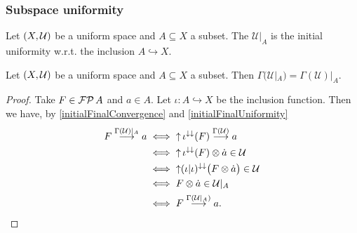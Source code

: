\subsubsection{Subspace uniformity}
\begin{definition}
Let $\sSet{X, \mathcal{U}}$ be a uniform space and $A\subseteq X$ a subset. The  $\mathcal{U}|_A$ is the initial uniformity w.r.t. the inclusion $A\hookrightarrow X$.
\end{definition}

\begin{proposition} \label{subspaceUniformConvergence}
Let $\sSet{X, \mathcal{U}}$ be a uniform space and $A\subseteq X$ a subset. Then $\Gamma(\mathcal{U}|_A) = \Gamma(\mathcal{U})|_A$. 
\end{proposition}
\begin{proof}
Take $F\in \operatorname{\mathcal{FP}}{A}$ and $a\in A$. Let $\iota: A\hookrightarrow X$ be the inclusion function. Then we have, by \ref{initialFinalConvergence} and \ref{initialFinalUniformity}
\begin{align*}
F \overset{\Gamma(\mathcal{U})|_A}{\longrightarrow} a &\iff \operatorname{\uparrow}\iota^{\downarrow\downarrow}(F) \overset{\Gamma(\mathcal{U})}{\longrightarrow} a \\
&\iff \operatorname{\uparrow}\iota^{\downarrow\downarrow}(F)\otimes \dot{a} \in \mathcal{U} \\
&\iff \operatorname{\uparrow}(\iota|\iota)^{\downarrow\downarrow}\big(F\otimes \dot{a}\big) \in \mathcal{U} \\
&\iff F\otimes \dot{a} \in \mathcal{U}|_A \\
&\iff F \overset{\Gamma(\mathcal{U}|_A)}{\longrightarrow} a.
\end{align*}
\end{proof}

